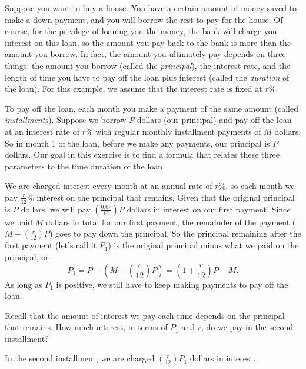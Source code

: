 \begin{exercises}
    Suppose you want to buy a house. You have a certain amount of money saved to make a down payment, and you will borrow the rest to pay for the house. Of course, for the privilege of loaning you the money, the bank will charge you interest on this loan, so the amount you pay back to the bank is more than the amount you borrow. In fact, the amount you ultimately pay depends on three things: the amount you borrow (called the \emph{principal}), the interest rate, and the length of time you have to pay off the loan plus interest (called the \emph{duration} of the loan). For this example, we assume that the interest rate is fixed at $r$\%.

    To pay off the loan, each month you make a payment of the same amount (called \emph{installments}). Suppose we borrow $P$ dollars (our principal) and pay off the loan at an interest rate of $r$\% with regular monthly installment payments of $M$ dollars. So in month 1 of the loan, before we make any payments, our principal is $P$ dollars. Our goal in this exercise is to find a formula that relates these three parameters to the time duration of the loan.

    We are charged interest every month at an annual rate of $r$\%, so each month we pay $\frac{r}{12}$\% interest on the principal that remains. Given that the original principal is $P$ dollars, we will pay $\left(\frac{0.0r}{12}\right)P$ dollars in interest on our first payment. Since we paid $M$ dollars in total for our first payment, the remainder of the payment ($M-\left(\frac{r}{12}\right)P$) goes to pay down the principal. So the principal remaining after the first payment (let's call it $P_1$) is the original principal minus what we paid on the principal, or
    \[P_1 = P - \left( M - \left(\frac{r}{12}\right)P\right) = \left(1 + \frac{r}{12}\right)P - M.\]
    As long as $P_1$ is positive, we still have to keep making payments to pay off the loan.

    \ba
    \item Recall that the amount of interest we pay each time depends on the principal that remains. How much interest, in terms of $P_1$ and $r$, do we pay in the second installment?

\begin{exerciseSolution}
\vs

In the second installment, we are charged $\left(\frac{r}{12}\right)P_1$ dollars in interest.

\vs

\end{exerciseSolution}


\end{exercises}
